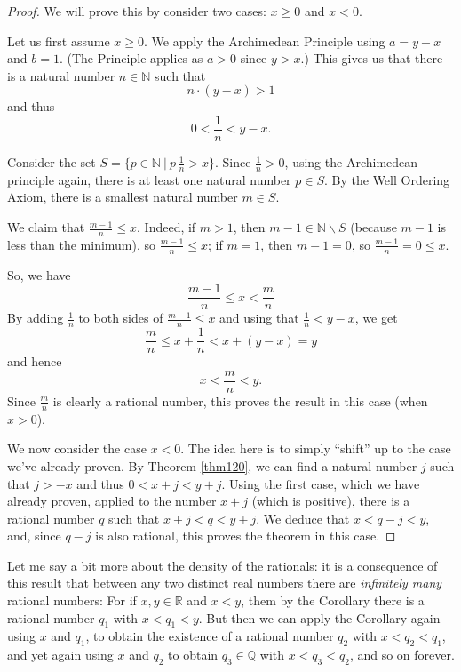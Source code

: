 \documentclass[12pt]{amsart}
\newcommand{\Q}{\mathbb{Q}}
\newcommand{\R}{{\mathbb{R}}}
\newcommand{\N}{\mathbb{N}}
\numberwithin{equation}{section}
\theoremstyle{plain} %
\theoremstyle{definition}
\theoremstyle{remark}
\begin{document}
\begin{proof} We will prove this by consider two cases: $x \geq 0$ and $x < 0$.

Let us first assume $x \geq 0$.
We apply the Archimedean Principle using $a = y-x$ and $b = 1$. (The Principle applies as
$a > 0$ since $y> x$.) This gives us that there is a natural number $n \in \N$ such that
$$
n \cdot (y-x) > 1
$$
and thus
$$
0 < \frac{1}{n} < y-x.
$$

Consider the set $S=\{p\in \N \ | \ p \, \frac{1}{n} >x \}$.
Since $\frac{1}{n} > 0$, using the Archimedean principle again, there is at least one natural number $p\in S$. By the Well Ordering Axiom, there is a smallest natural number $m\in S$. 

We claim that $\frac{m-1}{n} \leq x$. Indeed, if $m>1$, then $m-1\in \N \smallsetminus S$ (because $m-1$ is less than the minimum), so $\frac{m-1}{n}\leq x$; if $m=1$, then $m-1=0$, so $\frac{m-1}{n} = 0 \leq x$.

So, we have
$$
\frac{m-1}{n} \leq x< \frac{m}{n}
$$
By adding $\frac{1}{n}$ to both sides of $\frac{m-1}{n} \leq x$ and using that $\frac{1}{n} < y- x$, we get
$$
\frac{m}{n} \leq x + \frac{1}{n} < x + (y -x) = y
$$
and hence
$$
x < \frac{m}{n} < y.
$$
Since $\frac{m}{n}$ is clearly a rational number, this proves the result in this case (when $x > 0$). 

We now consider the case $x < 0$. The idea here is to simply ``shift'' up to the case we've already proven. 
By Theorem \ref{thm120}, we can find a natural number $j$ such that $j > -x$ and thus $0 < x +j < y +j$. Using the first case, which we have already proven,
applied 
to the number $x + j$ (which is positive), there is a rational number $q$ such that $x+j < q < y+j$. We deduce that $x < q-j < y$, and, since $q - j$ is also
rational, this proves the theorem in this case.
\end{proof}





Let me say a bit more about the density of the rationals:
it is a consequence of this result 
that between any two distinct real numbers there are {\em infinitely many} rational numbers: For if $x,y \in
\R$ and $x < y$, them by the Corollary there is a rational number $q_1$ with $x < q_1 < y$. But then we can apply the Corollary again using $x$ and $q_1$, to
obtain the existence of a rational number $q_2$ with $x < q_2 < q_1$, and yet again using $x$ and
$q_2$ to obtain $q_3 \in \Q$ with $x < q_3 < q_2$, and so on forever.
\end{document}

